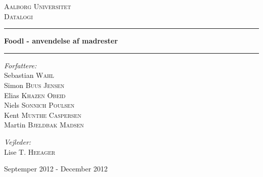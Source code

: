\begin{titlingpage}
\centering
\vspace*{1.0cm}

\textsc{\LARGE Aalborg Universitet}\\[0.75cm]
\textsc{\Large Datalogi}\\[1.75cm]

\hrule
{ \huge \bfseries Foodl - anvendelse af madrester}
\vspace{0.5cm}
\hrule
\vspace{0.75cm}

  \begin{flushleft} \large
    \vspace{0pt}
    \emph{Forfattere:}\\
    Sebastian \textsc{Wahl}\\
    Simon \textsc{Buus Jensen}\\
    Elias \textsc{Khazen Obeid}\\
    Niels \textsc{Sonnich Poulsen}\\
    Kent \textsc{Munthe Caspersen}\\
    Martin \textsc{Bjeldbak Madsen}\\
  \end{flushleft}

  \begin{flushright} \large
  \vspace{-132pt}
  \emph{Vejleder:}\\
  Lise T. \textsc{Heeager}
  \end{flushright}


\vfill

{\large Septemper 2012 - December 2012}

\end{titlingpage}
